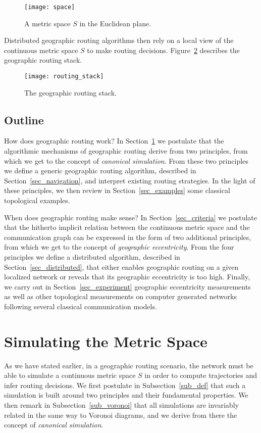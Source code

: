 \documentclass{article}
\begin{document}
\begin{figure}[h]
\begin{center}
\texttt{[image: space]}
\caption{A metric space $S$ in the Euclidean plane.}
\label{fig_space}
\end{center}
\end{figure}

Distributed geographic routing algorithms then rely on a local view of the continuous metric space $S$ to make routing decisions. Figure~\ref{fig_stack} describes the geographic routing stack.

\begin{figure}[ħtb]
\begin{center}
\texttt{[image: routing\_stack]}
\caption{The geographic routing stack.}
\label{fig_stack}
\end{center}
\end{figure}

\subsection*{Outline}

How does geographic routing work? In Section~\ref{sec_simul_metric} we postulate that the algorithmic mechanisms of geographic routing derive from two principles, from which we get to the concept of {\em canonical simulation}. From these two principles we define a generic geographic routing algorithm, described in Section~\ref{sec_navigation}, and interpret existing routing strategies. In the light of these principles, we then review in Section~\ref{sec_examples} some classical topological examples.

When does geographic routing make sense? In Section~\ref{sec_criteria} we postulate that the hitherto implicit relation between the continuous metric space and the communication graph can be expressed in the form of two additional principles, from which we get to the concept of {\em geographic eccentricity}. From the four principles we define a distributed algorithm, described in Section~\ref{sec_distributed}, that either enables geographic routing on a given localized network or reveals that its geographic eccentricity is too high. Finally, we carry out in Section~\ref{sec_experiment} geographic eccentricity measurements as well as other topological measurements on computer generated networks following several classical communication models.

\section{Simulating the Metric Space}
\label{sec_simul_metric}
As we have stated earlier, in a geographic routing scenario, the network must be able to simulate a continuous metric space $S$ in order to compute trajectories and infer routing decisions. We first postulate in Subsection~\ref{sub_def} that such a simulation is built around two principles and their fundamental properties. We then remark in Subsection~\ref{sub_voronoi} that all simulations are invariably related in the same way to Voronoi diagrams, and we derive from there the concept of {\em canonical simulation}.
\end{document}
